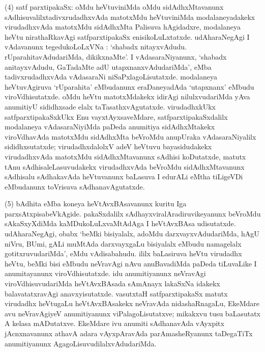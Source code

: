 (4) satf parxtipakaSx: oMdu heVtuviniMda oMdu sidAdhxMtavanunx sAdhisuvalilx\break tadivx\-rudadhxvAda matotxMdu heVtuviniMda modalaneyadakekx virudadhxvAda matotxMdu sidAdhxMta Palisuva hAgidadxre, modalaneya heVtu nirathaRkavAgi satfparxtipakaSx enisi\-koLuLxtatxde. udAharaNegAgi I vAdavanunx tegedukoLoLxVNa : `shabadx nitayxvAdudu. rUparahitavAdudariMda, dikikxnaMte'. I vAdasaraNiyanunx, `shabadx anitayxvAdudu, GaTadaMte adU utapxnanxvAdudariMda', eMba tadivxrudadhxvAda vAdasaraNi niSaPxlagoLisutatxde. modalaneya heVtuvAgiruva `rUparahita' eMbudanunx eraDaneyadAda \hbox{`utapxnanx'} eMbudu viroVdhisutatxde. oMdu heVtu matotxMdakekx idirAgi nilulxvudariMda yAva anumitiyU sididhxsade elalx taTasathxvAgutatxde. virudadhxkUkx satfparxtipakaSxkUkx Enu vayxtAyxsa\-veMdare, satfparxtipakaSxdalilx modalaneya vAdasaraNiyiMda paDeda anumitiya sidAdhxM\-takekx viroVdhavAda matotxMdu sidAdhxMta beVroMdu anupUraka vAdasaraNiyalilx sididhx\-sutatxde; virudadhxdalolxV adeV heVtuvu bayasidudakekx virudadhxvAda matotxMdu sidAdhxMta\-vanunx sAdhisi koDutatxde, matutx tAnu sAdhisaleLasuvudakekx virudadhxvAda beVroMdu sidAdhxMtavanunx sAdhisalu sAdhakavAda heVtuvanunx baLasuva I edurALi eMtha tiLigeVDi eMbudanunx toVrisuva sAdhanavAgutatxde.

(5) bAdhita eMba koneya heVtAvxBAsavanunx kuritu Iga parxsAtxpisabeVkAgide. pakaSxdalilx sAdhayxviralAradiruvikeyanunx beVroMdu sAkaSxyXdiMda kaMDukoLuLxvaMtAdAga I heVtAvxBAsa udisutatxde. udAharaNegAgi, obabx `beMki bisiyalalx, adoMdu darxvayx\-vAdudariMda, hAgU niVru, BUmi, gALi muMtAda darxvayxgaLu bisiyalalx eMbudu namagelalx gotitxruvudariMda', eMdu vAdisabahudu. ililx baLasiruva heVtu \hbox{virudadhx} heVtu, beMki bisi eMbudu neVravAgi nAvu anuBavadiMda paDeda tiLuvaLike I anu\-mitayanunx viroVdhisutatxde. idu anumitiyanunx neVravAgi viroVdhisuvu\-dariMda heVtAvxBAsada sAmAnayx lakaSxNa idakekx balavatatxravAgi anavxyisutatxde. vasutxtaH satf\-parxtipakaSx matutx virudadhx heVtugaLu heVtAvxBAsakekx neVravAda nidashaRnagaLu, EkeMdare avu neVra\-vAgiyeV anumitiyanunx viPalagoLisutatxve; mikakxvu tusu baLasutatx A kelasa mADu\-tatxve. EkeMdare ivu anumiti sAdhanavAda vAyxpitx jAcnxnavanunx athavA adara vAyxpAra\-vAda parAmasheRyanunx taDegaTiTx anumitiyanunx AgagoLisuvudilalxvAdudariMda.

